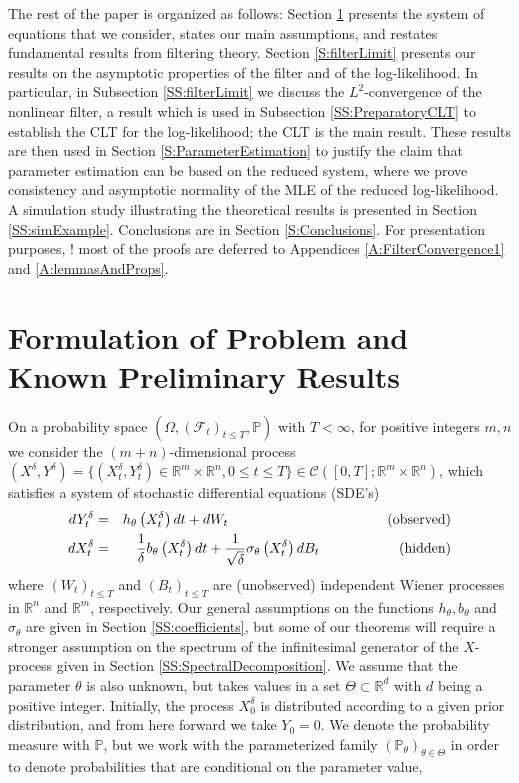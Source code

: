 \documentclass{article}
\begin{document}
The rest of the paper is organized as follows: Section \ref{S:model} presents the system of equations that we consider, states our main assumptions, and restates fundamental results from filtering theory. Section \ref{S:filterLimit} presents our results on the asymptotic properties of the filter and of the log-likelihood. In particular, in Subsection \ref{SS:filterLimit} we discuss the $L^{2}$-convergence of the nonlinear filter, a result which is used in Subsection \ref{SS:PreparatoryCLT} to establish the CLT for the log-likelihood; the CLT is the main result. These results are then used in Section \ref{S:ParameterEstimation} to justify the claim that parameter estimation can be based on the reduced system, where we prove consistency and asymptotic normality of the MLE of the reduced log-likelihood. A simulation study illustrating the theoretical results is  presented in Section \ref{SS:simExample}. Conclusions are in Section \ref{S:Conclusions}. For presentation purposes, !
 most of the proofs are deferred to Appendices \ref{A:FilterConvergence1} and \ref{A:lemmasAndProps}.
\section{Formulation of Problem and Known Preliminary Results} \label{S:model}
On a probability space $(\Omega,(\mathcal F_t)_{t\leq T},\mathbb P)$ with $T<\infty$, for positive integers $m,n$ we consider the $(m+n)$-dimensional process $(X^{\delta},Y^{\delta})=\{(X^{\delta}_{t},Y^{\delta}_{t})\in\mathbb R^m\times\mathbb R^n, 0\leq t\leq T\}\in \mathcal C([0,T];\mathbb R^m\times\mathbb R^n)$, which satisfies a system of stochastic differential equations (SDE's)
\begin{eqnarray}
dY^{\delta}_{t}&=&h_{\theta}\left(X^{\delta}_{t}\right)dt + dW_{t}\nonumber\hspace{4cm}\hbox{(observed)}\\
dX^{\delta}_{t}&=& \frac{1}{\delta}b_{\theta}\left(X^{\delta}_{t}\right)dt + \frac{1}{\sqrt{\delta}}\sigma_{\theta}\left(X^{\delta}_{t}\right)dB_{t}\label{Eq:Model3}\hspace{2cm}\hbox{(hidden)}
\end{eqnarray}
where $(W_t)_{t\leq T}$ and $(B_t)_{t\leq T}$ are (unobserved) independent Wiener processes in $\mathbb{R}^{n}$ and $\mathbb R^m$, respectively. Our general assumptions on the functions $h_\theta,b_\theta$ and $\sigma_\theta$ are given in Section \ref{SS:coefficients}, but some of our theorems will require a stronger assumption on the spectrum of the infinitesimal generator of the $X$-process given in Section \ref{SS:SpectralDecomposition}. We assume that the parameter $\theta$ is also unknown, but takes values in a set $\Theta\subset\mathbb{R}^{d}$ with $d$ being a positive integer. Initially, the process $X_0^\delta$ is distributed according to a given prior distribution, and from here forward we  take $Y_0=0$. We denote the probability measure with $\mathbb P$, but we work with the parameterized family $(\mathbb P_\theta)_{\theta\in\Theta}$ in order to denote probabilities that are conditional on the parameter value,
\end{document}
